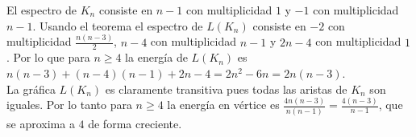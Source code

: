\documentclass[12pt]{article}
\title{ }
\date{}
\author{}
\title{}
\date{}
\author{}
\begin{document}
El espectro de $K_n$ consiste en $n-1$ con multiplicidad $1$ y $-1$ con multiplicidad $n-1$. Usando el teorema el espectro de $L(K_n)$ consiste en $-2$ con multiplicidad $\frac{n(n-3)}{2}$, $n-4$ con multiplicidad $n-1$ y $2n-4$ con multiplicidad $1$. Por lo que para $n\geq 4$ la energía de $L(K_n)$ es $n(n-3)+(n-4)(n-1)+2n-4=2n^2-6n=2n(n-3)$.\\

La gráfica $L(K_n)$ es claramente transitiva pues todas las aristas de $K_n$ son iguales. Por lo tanto para $n\geq 4$ la energía en vértice es $\frac{4n(n-3)}{n(n-1)}=\frac{4(n-3)}{n-1}$, que se aproxima a $4$ de forma creciente.\\
\end{document}
